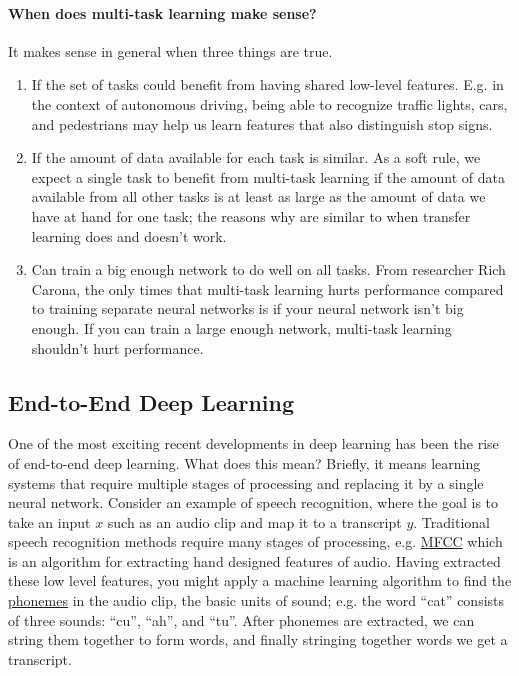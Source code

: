 \documentclass[12pt]{article}
\begin{document}
\paragraph{When does multi-task learning make sense?} It makes sense in general when three things are true.
\begin{enumerate}   \item  If the set of tasks could benefit from having shared low-level features. E.g. in the context of autonomous driving, being able to recognize traffic lights, cars, and pedestrians may help us learn features that also distinguish stop signs.
  \item If the amount of data available for each task is similar. As a soft rule, we expect a single task to benefit from multi-task
    learning if the amount of data available from all other tasks is at least as large as the amount of data we have at hand
    for one task; the reasons why are similar to when transfer learning does and doesn't work.
  \item Can train a big enough network to do well on all tasks. From researcher Rich Carona, the only times 
    that multi-task learning hurts performance compared to training separate neural networks is if your 
    neural network isn't big enough. If you can train a large enough network, multi-task learning shouldn't hurt performance. \end{enumerate}

\subsection{End-to-End Deep Learning} One of the most exciting recent developments in deep learning has been the rise
of end-to-end deep learning. What does this mean? Briefly, it means learning systems that require multiple stages of processing
and replacing it by a single neural network. Consider an example of speech recognition, where the goal is to take an input $x$
such as an audio clip and map it to a transcript $y$. Traditional speech recognition methods require many stages of processing,
e.g. \href{https://en.wikipedia.org/wiki/Mel-frequency_cepstrum}{MFCC} which is an algorithm for extracting hand designed features
of audio. Having extracted these low level features, you might apply a machine learning algorithm to find the \href{https://en.wikipedia.org/wiki/Phoneme}{phonemes} in the audio clip, the basic units of sound; e.g. the word ``cat'' consists of three sounds: ``cu'', ``ah'', and ``tu''. After phonemes are extracted, we can string them together to form words, and finally stringing together words
we get a transcript.
\end{document}

